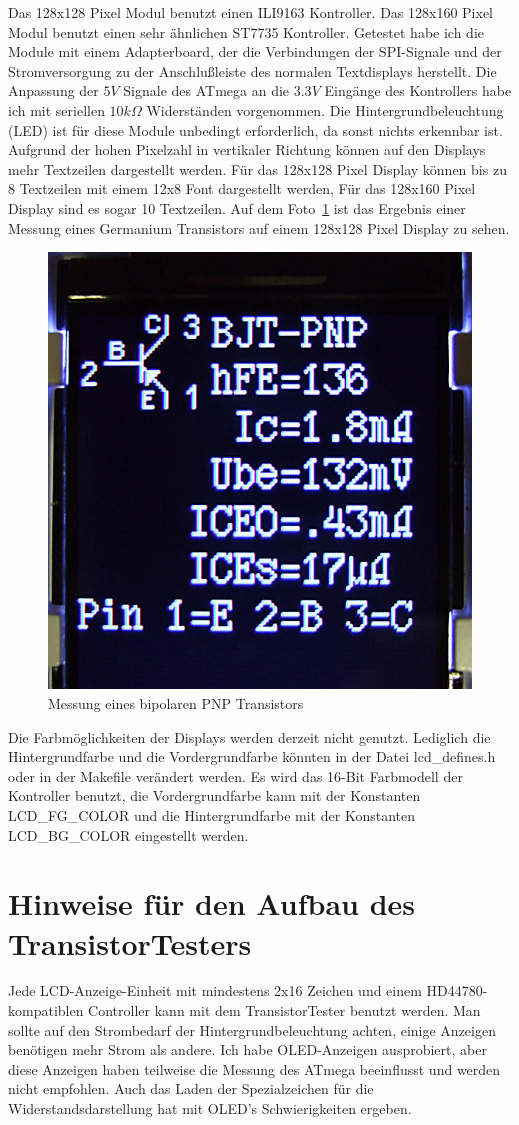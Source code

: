 Das 128x128 Pixel Modul benutzt einen ILI9163 Kontroller.
Das 128x160 Pixel Modul benutzt einen sehr ähnlichen ST7735 Kontroller.
Getestet habe ich die Module mit einem Adapterboard, der die Verbindungen
der SPI-Signale und der Stromversorgung zu der Anschlußleiste des normalen Textdisplays
herstellt. Die Anpassung der \(5V\) Signale des ATmega an die \(3.3V\) Eingänge des Kontrollers
habe ich mit seriellen \(10k\Omega\) Widerständen vorgenommen.
Die Hintergrundbeleuchtung (LED) ist für diese Module unbedingt erforderlich, da sonst
nichts erkennbar ist.
Aufgrund der hohen Pixelzahl in vertikaler Richtung können auf den Displays mehr Textzeilen dargestellt
werden. Für das 128x128 Pixel Display können bis zu 8 Textzeilen mit einem 12x8 Font dargestellt werden,
Für das 128x160 Pixel Display sind es sogar 10 Textzeilen.
Auf dem Foto~\ref{fig:Color_PNP} ist das Ergebnis einer Messung eines Germanium Transistors auf einem
128x128 Pixel Display zu sehen.

\begin{figure}[H]
\centering
\includegraphics[width=.46\textwidth]{../PNG/Color_PNP_ILI9163.jpg}	%
\caption{Messung eines bipolaren PNP Transistors}
\label{fig:Color_PNP}
\end{figure}

Die Farbmöglichkeiten der Displays werden derzeit nicht genutzt. Lediglich die Hintergrundfarbe
und die Vordergrundfarbe könnten in der Datei lcd\_defines.h oder in der Makefile verändert werden.
Es wird das 16-Bit Farbmodell der Kontroller benutzt, die Vordergrundfarbe kann mit der Konstanten
LCD\_FG\_COLOR und die Hintergrundfarbe mit der Konstanten LCD\_BG\_COLOR eingestellt werden.

\section{Hinweise für den Aufbau des TransistorTesters}
Jede LCD-Anzeige-Einheit mit mindestens 2x16 Zeichen und einem HD44780-kompatiblen Controller kann mit
dem TransistorTester benutzt werden.
Man sollte auf den Strombedarf der Hintergrundbeleuchtung achten, einige Anzeigen benötigen
mehr Strom als andere.
Ich habe OLED-Anzeigen ausprobiert, aber diese Anzeigen haben teilweise die Messung des
ATmega beeinflusst und werden nicht empfohlen. Auch das Laden der Spezialzeichen für die 
Widerstandsdarstellung hat mit OLED's Schwierigkeiten ergeben.

